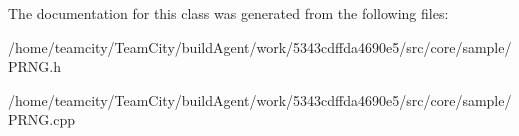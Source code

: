 The documentation for this class was generated from the following files\+:\begin{DoxyCompactItemize}
\item 
/home/teamcity/\+Team\+City/build\+Agent/work/5343cdffda4690e5/src/core/sample/P\+R\+N\+G.\+h\item 
/home/teamcity/\+Team\+City/build\+Agent/work/5343cdffda4690e5/src/core/sample/P\+R\+N\+G.\+cpp\end{DoxyCompactItemize}
